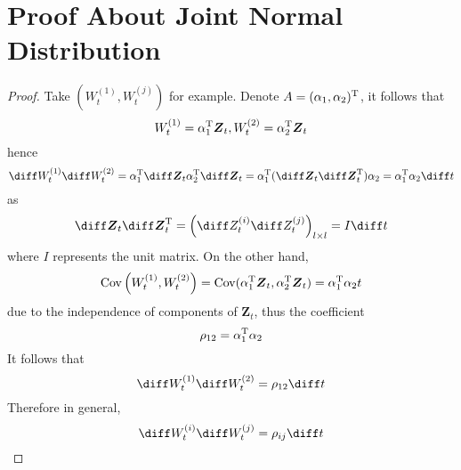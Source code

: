     \appendix
    \section{Proof About Joint Normal Distribution}
    \label{app:jn}
    \begin{proof}
        Take $(W_t^{(1)},W_t^{(j)})$ for example.
        Denote $A=(\alpha_1,\alpha_2)^\mathrm T$,
        it follows that
        \[W_t^{(1)}=\alpha_1^\mathrm T\boldsymbol Z_t,
        W_t^{(2)}=\alpha_2^\mathrm T\boldsymbol Z_t\]
        hence
        \[\diff W_t^{(1)}\diff W_t^{(2)}
        =\alpha_1^\trans\diff\boldsymbol Z_t
        \alpha_2^\trans\diff\boldsymbol Z_t
        =\alpha_1^\trans(\diff\boldsymbol Z_t\diff\boldsymbol Z_t^\trans)\alpha_2
        =\alpha_1^\trans\alpha_2\diff t
        \]
        as
        \[\diff\boldsymbol Z_t\diff\boldsymbol Z_t^\trans
        =\left(\diff Z_t^{(i)}\diff Z_t^{(j)}\right)_{l\times l}=I\diff t\]
        where $I$ represents the unit matrix.
        On the other hand,
        \[\mathrm{Cov}\left(W_t^{(1)},W_t^{(2)}\right)
        =\mathrm{Cov}(\alpha_1^\mathrm T\boldsymbol Z_t,\alpha_2^\mathrm T\boldsymbol Z_t)
        =\alpha_1^\mathrm T\alpha_2 t\]
        due to the independence of components of $\boldsymbol Z_t$,
        thus the coefficient
        \[\rho_{12}=\alpha_1^\mathrm T\alpha_2\]
        It follows that
        \[\diff W_t^{(1)}\diff W_t^{(2)}=\rho_{12}\diff t\]
        Therefore in general,
        \[\diff W_t^{(i)}\diff W_t^{(j)}=\rho_{ij}\diff t\]
    \end{proof}